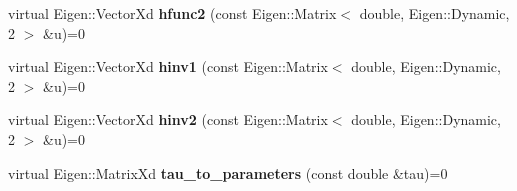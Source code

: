 \begin{DoxyCompactItemize}
\item 
virtual Eigen\+::\+Vector\+Xd {\bfseries hfunc2} (const Eigen\+::\+Matrix$<$ double, Eigen\+::\+Dynamic, 2 $>$ \&u)=0\hypertarget{classvinecopulib_1_1_abstract_bicop_a604690344660208cbf7a14aed322d0c6}{}\label{classvinecopulib_1_1_abstract_bicop_a604690344660208cbf7a14aed322d0c6}

\item 
virtual Eigen\+::\+Vector\+Xd {\bfseries hinv1} (const Eigen\+::\+Matrix$<$ double, Eigen\+::\+Dynamic, 2 $>$ \&u)=0\hypertarget{classvinecopulib_1_1_abstract_bicop_a4638c25e1dbb34288b65bcc9f1f6f04e}{}\label{classvinecopulib_1_1_abstract_bicop_a4638c25e1dbb34288b65bcc9f1f6f04e}

\item 
virtual Eigen\+::\+Vector\+Xd {\bfseries hinv2} (const Eigen\+::\+Matrix$<$ double, Eigen\+::\+Dynamic, 2 $>$ \&u)=0\hypertarget{classvinecopulib_1_1_abstract_bicop_a945d782285a9d11a59795e894e8c216b}{}\label{classvinecopulib_1_1_abstract_bicop_a945d782285a9d11a59795e894e8c216b}

\item 
virtual Eigen\+::\+Matrix\+Xd {\bfseries tau\+\_\+to\+\_\+parameters} (const double \&tau)=0\hypertarget{classvinecopulib_1_1_abstract_bicop_a48fc84b668c515745754bfe33ab7cbcf}{}\label{classvinecopulib_1_1_abstract_bicop_a48fc84b668c515745754bfe33ab7cbcf}

\end{DoxyCompactItemize}
{\bf }\par
